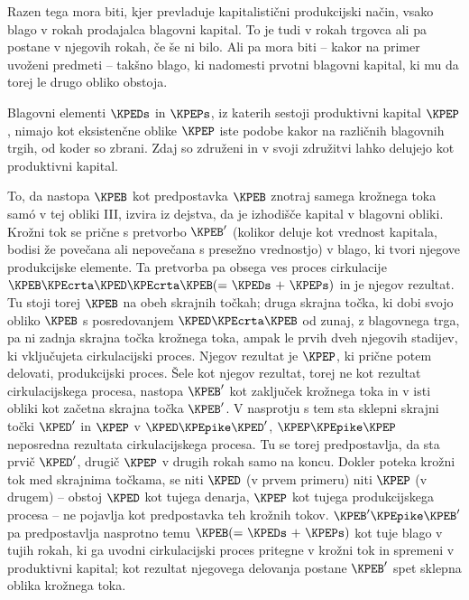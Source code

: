 \documentclass[kapital_02.tex]{subfiles}
\begin{document}
Razen tega mora biti, kjer prevladuje kapitalistični produkcijski način, vsako blago v rokah prodajalca blagovni kapital. To je tudi v rokah trgovca ali pa postane v njegovih rokah, če še ni bilo. Ali pa mora biti -- kakor na primer uvoženi predmeti -- takšno blago, ki nadomesti prvotni blagovni kapital, ki mu da torej le drugo obliko obstoja.

Blagovni elementi \( \KPEDs \) in \( \KPEPs \), iz katerih sestoji produktivni kapital \( \KPEP \), nimajo kot eksistenčne oblike \( \KPEP \) iste podobe kakor na različnih blagovnih trgih, od koder so zbrani. Zdaj \KPEstran so združeni in v svoji združitvi lahko delujejo kot produktivni kapital.

To, da nastopa \( \KPEB \) kot predpostavka \( \KPEB \) znotraj samega krožnega toka sam\'o v tej obliki III, izvira iz dejstva, da je izhodišče kapital v blagovni obliki. Krožni tok se prične s pretvorbo \( \KPEB' \) (kolikor deluje kot vrednost kapitala, bodisi že povečana ali nepovečana s presežno vrednostjo) v blago, ki tvori njegove produkcijske elemente. Ta pretvorba pa obsega ves proces cirkulacije \( \KPEB \KPEcrta \KPED \KPEcrta \KPEB ( \textrm{= } \KPEDs \textrm{ + } \KPEPs ) \) in je njegov rezultat. Tu stoji torej \( \KPEB \) na obeh skrajnih točkah; druga skrajna točka, ki dobi svojo obliko \( \KPEB \) s posredovanjem \( \KPED \KPEcrta \KPEB \) od zunaj, z blagovnega trga, pa ni zadnja skrajna točka krožnega toka, ampak le prvih dveh njegovih stadijev, ki vključujeta cirkulacijski proces. Njegov rezultat je \( \KPEP \), ki prične potem delovati, produkcijski proces. Šele kot njegov rezultat, torej ne kot rezultat cirkulacijskega procesa, nastopa \( \KPEB' \) kot zaključek krožnega toka in v isti obliki kot začetna skrajna točka \( \KPEB' \). V nasprotju s tem sta sklepni skrajni točki \( \KPED' \) in \( \KPEP \) v \( \KPED \KPEpike \KPED' \), \( \KPEP \KPEpike \KPEP \) neposredna rezultata cirkulacijskega procesa. Tu se torej predpostavlja, da sta prvič \( \KPED' \), drugič \( \KPEP \) v drugih rokah samo na koncu. Dokler poteka krožni tok med skrajnima točkama, se niti \( \KPED \) (v prvem primeru) niti \( \KPEP \) (v drugem) -- obstoj \( \KPED \) kot tujega denarja, \( \KPEP \) kot tujega produkcijskega procesa -- ne pojavlja kot predpostavka teh krožnih tokov. \( \KPEB' \KPEpike \KPEB' \) pa predpostavlja nasprotno temu \( \KPEB ( \textrm{= } \KPEDs \textrm{ + } \KPEPs ) \) kot tuje blago v tujih rokah, ki ga uvodni cirkulacijski proces pritegne v krožni tok in spremeni v produktivni kapital; kot rezultat njegovega delovanja postane \( \KPEB' \) spet sklepna oblika krožnega toka.
\end{document}
